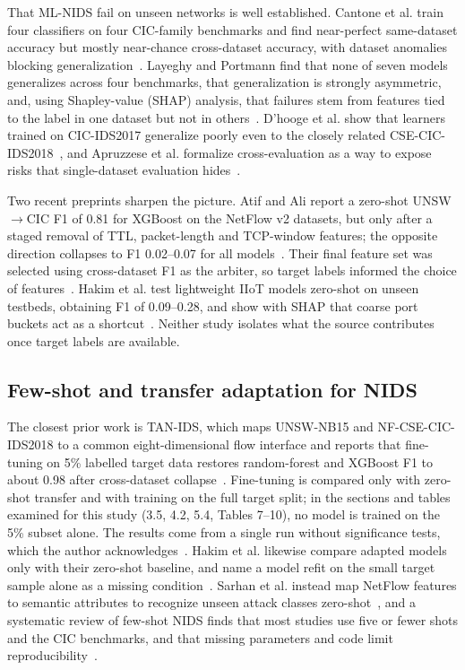 \documentclass[11pt]{article}
\begin{document}
That ML-NIDS fail on unseen networks is well established. Cantone et al. train four classifiers on four CIC-family benchmarks and find near-perfect same-dataset accuracy but mostly near-chance cross-dataset accuracy, with dataset anomalies blocking generalization~\cite{cantone2024cross}. Layeghy and Portmann find that none of seven models generalizes across four benchmarks, that generalization is strongly asymmetric, and, using Shapley-value (SHAP) analysis, that failures stem from features tied to the label in one dataset but not in others~\cite{layeghy2023explainable}. D'hooge et al. show that learners trained on CIC-IDS2017 generalize poorly even to the closely related CSE-CIC-IDS2018~\cite{dhooge2020inter}, and Apruzzese et al. formalize cross-evaluation as a way to expose risks that single-dataset evaluation hides~\cite{apruzzese2022cross}.

Two recent preprints sharpen the picture. Atif and Ali report a zero-shot UNSW$\to$CIC F1 of 0.81 for XGBoost on the NetFlow v2 datasets, but only after a staged removal of TTL, packet-length and TCP-window features; the opposite direction collapses to F1 0.02--0.07 for all models~\cite{atif2026threeaxis}. Their final feature set was selected using cross-dataset F1 as the arbiter, so target labels informed the choice of features~\cite{atif2026threeaxis}. Hakim et al. test lightweight IIoT models zero-shot on unseen testbeds, obtaining F1 of 0.09--0.28, and show with SHAP that coarse port buckets act as a shortcut~\cite{hakim2026crossdomain}. Neither study isolates what the source contributes once target labels are available.

\subsection{Few-shot and transfer adaptation for NIDS}

The closest prior work is TAN-IDS, which maps UNSW-NB15 and NF-CSE-CIC-IDS2018 to a common eight-dimensional flow interface and reports that fine-tuning on 5\% labelled target data restores random-forest and XGBoost F1 to about 0.98 after cross-dataset collapse~\cite{hathanh2026tanids}. Fine-tuning is compared only with zero-shot transfer and with training on the full target split; in the sections and tables examined for this study (3.5, 4.2, 5.4, Tables 7--10), no model is trained on the 5\% subset alone. The results come from a single run without significance tests, which the author acknowledges~\cite{hathanh2026tanids}. Hakim et al. likewise compare adapted models only with their zero-shot baseline, and name a model refit on the small target sample alone as a missing condition~\cite{hakim2026crossdomain}. Sarhan et al. instead map NetFlow features to semantic attributes to recognize unseen attack classes zero-shot~\cite{sarhan2023zeroshot}, and a systematic review of few-shot NIDS finds that most studies use five or fewer shots and the CIC benchmarks, and that missing parameters and code limit reproducibility~\cite{roszeitis2026fewshot}.
\end{document}
